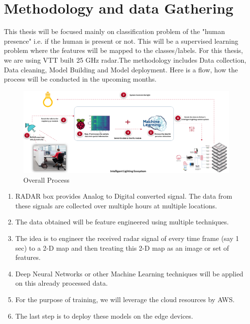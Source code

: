 \chapter{Methodology and data Gathering}
\label{chapter:methodology}
This thesis will be focused mainly on classification problem of the "human presence" i.e. if the human is present or not. This will be a supervised learning problem where the features will be mapped to the classes/labels.
For this thesis, we are using VTT built 25 GHz radar.The methodology includes Data collection, Data cleaning, Model Building and Model deployment. Here is a flow, how the process will be conducted in the upcoming months.


\begin{figure}[ht]
  \begin{center}
    \includegraphics[width=1\textwidth]{Master's thesis/images/thesis_presentation.png} 
    \caption{Overall Process}
    \label{fig:basic_principle}
  \end{center}
\end{figure}


\begin{enumerate}
    \item RADAR box provides Analog to Digital converted signal. The data from these signals are collected over multiple hours at multiple locations.
    \item The data obtained will be feature engineered using multiple techniques.
    \item The idea is to engineer the received radar signal of every time frame (say 1 sec) to a 2-D map and then treating this 2-D map as an image or set of features.
    \item Deep Neural Networks or other Machine Learning techniques will be applied on this already processed data.
    \item For the purpose of training, we will leverage the cloud resources by AWS.
    \item The last step is to deploy these models on the edge devices.
\end{enumerate}

